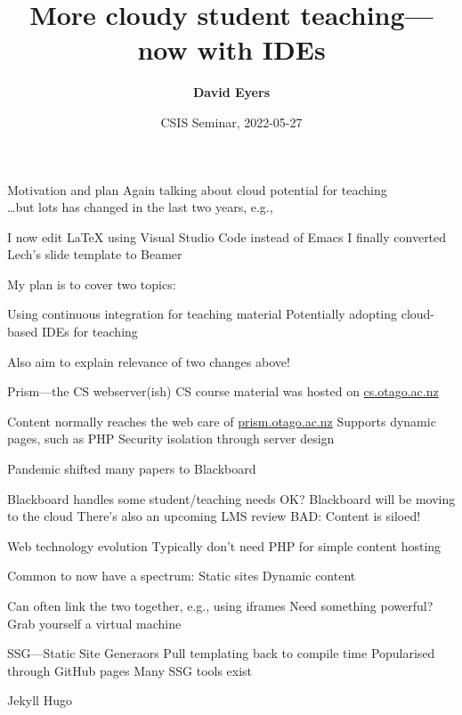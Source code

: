 \documentclass[aspectratio=169,t]{beamer}
\title[2022-05-27---CSIS Seminar---David Eyers]{More cloudy student teaching---now with IDEs}
\date{CSIS Seminar, 2022-05-27}
\author{\textbf{David Eyers}}
\begin{document}
\begin{frame}
  \titlepage
\end{frame}

\begin{dframe}{Motivation and plan}
  \1 Again talking about cloud potential for teaching\\
     \dots but lots has changed in the last two years, e.g.,

  \2 I now edit \LaTeX{} using Visual Studio Code instead of Emacs
  \2 I finally converted Lech's slide template to Beamer
  
  \bigskip

  \1 My plan is to cover two topics:

  \2 Using continuous integration for teaching material
  \2 Potentially adopting cloud-based IDEs for teaching

  \bigskip

  \1 Also aim to explain relevance of two changes above!

\end{dframe}

\begin{dframe}{Prism---the CS webserver(ish)}
  \1 CS course material was hosted on \url{cs.otago.ac.nz}

  \2 Content normally reaches the web care of \url{prism.otago.ac.nz}
  \2 Supports dynamic pages, such as PHP
  \2 Security isolation through server design

  \bigskip

  \1 Pandemic shifted many papers to Blackboard

  \2 Blackboard handles some student/teaching needs OK?
  \2 Blackboard will be moving to the cloud
  \2 There's also an upcoming LMS review
  \2 BAD: Content is siloed!
\end{dframe}

\begin{dframe}{Web technology evolution}
  \1 Typically don't need PHP for simple content hosting
  
  \2 Common to now have a spectrum:
  \2 Static sites
  \2 Dynamic content

  \1 Can often link the two together, e.g., using iframes
  \1 Need something powerful? Grab yourself a virtual machine
\end{dframe}

\begin{dframe}{SSG---Static Site Generaors}
  \1 Pull templating back to compile time
  \1 Popularised through GitHub pages
  \1 Many SSG tools exist

  \2 Jekyll
  \2 Hugo
\end{dframe}
\end{document}
